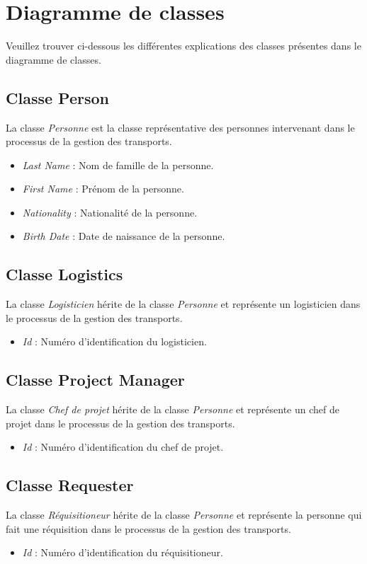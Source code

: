 \section{Diagramme de classes}

Veuillez trouver ci-dessous les différentes explications des classes présentes dans le diagramme de classes.
\subsection{Classe Person}
La classe \textit{Personne} est la classe représentative des personnes intervenant dans le processus de la gestion des transports.
\begin{itemize}
	\item \textit{Last Name} : Nom de famille de la personne.		
	\item \textit{First Name} : Prénom de la personne.
	\item \textit{Nationality} : Nationalité de la personne.
	\item \textit{Birth Date} : Date de naissance de la personne.
\end{itemize}

\subsection{Classe Logistics}
La classe \textit{Logisticien} hérite de la classe \textit{Personne} et représente un logisticien dans le processus de la gestion des transports.
\begin{itemize}
	\item \textit{Id} : Numéro d'identification du logisticien.
\end{itemize}

\subsection{Classe Project Manager}
La classe \textit{Chef de projet} hérite de la classe \textit{Personne} et représente un chef de projet dans le processus de la gestion des transports.
\begin{itemize}
	\item \textit{Id} : Numéro d'identification du chef de projet.
\end{itemize}

\subsection{Classe Requester}
La classe \textit{Réquisitioneur} hérite de la classe \textit{Personne} et représente la personne qui fait une réquisition dans le processus de la gestion des transports.
\begin{itemize}
	\item \textit{Id} : Numéro d'identification du réquisitioneur.
\end{itemize}


